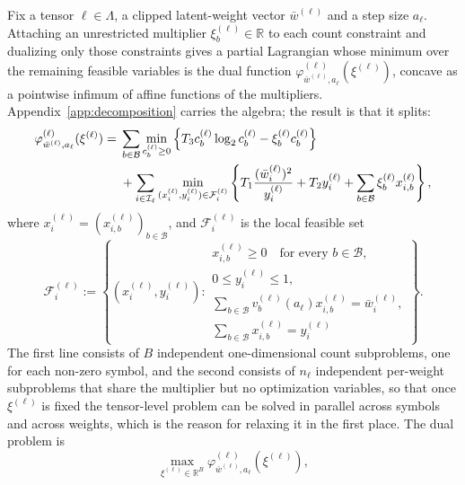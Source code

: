 \documentclass{article}
\begin{document}
Fix a tensor $\ell\in\Lambda$, a clipped latent-weight vector
$\bar w^{(\ell)}$ and a step size $a_\ell$. Attaching an unrestricted multiplier
$\xi_b^{(\ell)}\in\mathbb R$ to each count constraint and dualizing only those
constraints gives a partial Lagrangian whose minimum over the remaining feasible
variables is the dual function
$\varphi^{(\ell)}_{\bar w^{(\ell)},a_\ell}(\xi^{(\ell)})$, concave as a pointwise
infimum of affine functions of the multipliers. Appendix~\ref{app:decomposition}
carries the algebra; the result is that it splits:
\begin{align}
 \varphi_{\bar w^{(\ell)},a_\ell}^{(\ell)}(\xi^{(\ell)})
 ={}&
 \sum_{b\in\mathcal B}
 \min_{c_b^{(\ell)}\geq0}
 \left\{
   T_3c_b^{(\ell)}\log_2c_b^{(\ell)}
   -\xi_b^{(\ell)}c_b^{(\ell)}
 \right\}
 \notag\\
 &+\sum_{i\in\mathcal I_\ell}
 \min_{(x_i^{(\ell)},y_i^{(\ell)})\in
       \mathcal F_i^{(\ell)}}
 \left\{
   T_1\frac{(\bar w_i^{(\ell)})^2}{y_i^{(\ell)}}
   +T_2y_i^{(\ell)}
   +\sum_{b\in\mathcal B}
      \xi_b^{(\ell)}x_{i,b}^{(\ell)}
 \right\},
 \label{eq:dual-decomposition}
\end{align}
where $x_i^{(\ell)}=(x_{i,b}^{(\ell)})_{b\in\mathcal B}$, and
$\mathcal F_i^{(\ell)}$ is the local feasible set
\begin{equation}
 \mathcal F_i^{(\ell)}
 :=
 \left\{
 (x_i^{(\ell)},y_i^{(\ell)}):
 \begin{array}{l}
 x_{i,b}^{(\ell)}\geq0\quad \text{for every }b\in\mathcal B,\\
 0\leq y_i^{(\ell)}\leq1,\\
 \sum_{b\in\mathcal B}v_b^{(\ell)}(a_\ell)x_{i,b}^{(\ell)}
     =\bar w_i^{(\ell)},\\
 \sum_{b\in\mathcal B}x_{i,b}^{(\ell)}=y_i^{(\ell)}
 \end{array}
 \right\}.
 \label{eq:local-feasible-set}
\end{equation}
The first line consists of $B$ independent one-dimensional count subproblems, one
for each non-zero symbol, and the second consists of $n_\ell$ independent
per-weight subproblems that share the multiplier but no optimization variables,
so that once $\xi^{(\ell)}$ is fixed the tensor-level problem can be solved in
parallel across symbols and across weights, which is the reason for relaxing it
in the first place. The dual problem is
\begin{equation}
  \max_{\xi^{(\ell)}\in\mathbb R^B}
  \varphi_{\bar w^{(\ell)},a_\ell}^{(\ell)}(\xi^{(\ell)}),
  \label{eq:lagrangian-dual}
\end{equation}
\end{document}
